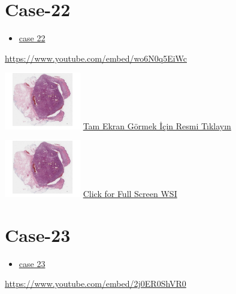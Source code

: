 \documentclass[
  letterpaper,
  paper=6in:9in,
  pagesize=pdftex,
  headinclude=on,
  footinclude=on,
  12pt]{scrbook}
\providecommand{\tightlist}{%
  \setlength{\itemsep}{0pt}\setlength{\parskip}{0pt}}\usepackage{longtable,booktabs,array}
\begin{document}
\hypertarget{sec-hacettepe-case-of-the-month-case-22}{%
\section{Case-22}\label{sec-hacettepe-case-of-the-month-case-22}}

\begin{itemize}
\tightlist
\item
  \href{https://www.youtube.com/watch?v=wo6N0q5EiWc\&ab_channel=KemalKosemehmetoglu}{case
  22}
\end{itemize}

\url{https://www.youtube.com/embed/wo6N0q5EiWc}

\href{https://images.patolojiatlasi.com/hacettepe-com-case-1/HE.html}{\includegraphics[width=0.25\textwidth,height=\textheight]{./screenshots/hacettepe-com-case-1_screenshot.png}}
\href{https://images.patolojiatlasi.com/hacettepe-com-case-/HE.html}{Tam
Ekran Görmek İçin Resmi Tıklayın}

\href{https://images.patolojiatlasi.com/hacettepe-com-case-1/HE.html}{\includegraphics[width=0.25\textwidth,height=\textheight]{./screenshots/hacettepe-com-case-1_screenshot.png}}
\href{https://images.patolojiatlasi.com/hacettepe-com-case-/HE.html}{Click
for Full Screen WSI}

\hypertarget{sec-hacettepe-case-of-the-month-case-23}{%
\section{Case-23}\label{sec-hacettepe-case-of-the-month-case-23}}

\begin{itemize}
\tightlist
\item
  \href{https://www.youtube.com/watch?v=2j0ER0ShVR0\&ab_channel=KemalKosemehmetoglu}{case
  23}
\end{itemize}

\url{https://www.youtube.com/embed/2j0ER0ShVR0}
\end{document}
